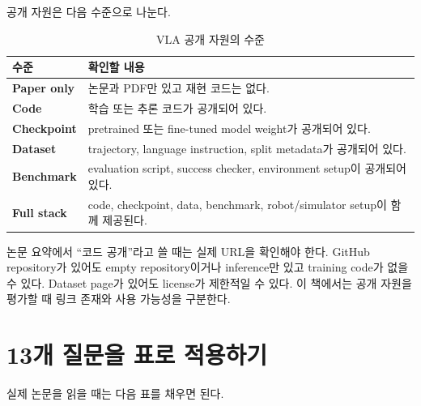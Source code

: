 공개 자원은 다음 수준으로 나눈다.

\begin{table}[t]
  \centering
  \caption{VLA 공개 자원의 수준}
  \label{tab:resource_levels}
  \begin{tabularx}{\textwidth}{>{\bfseries}p{28mm}X}
    \toprule
    수준 & 확인할 내용 \\
    \midrule
    Paper only & 논문과 PDF만 있고 재현 코드는 없다. \\
    Code & 학습 또는 추론 코드가 공개되어 있다. \\
    Checkpoint & pretrained 또는 fine-tuned model weight가 공개되어 있다. \\
    Dataset & trajectory, language instruction, split metadata가 공개되어 있다. \\
    Benchmark & evaluation script, success checker, environment setup이 공개되어 있다. \\
    Full stack & code, checkpoint, data, benchmark, robot/simulator setup이 함께 제공된다. \\
    \bottomrule
  \end{tabularx}
\end{table}

논문 요약에서 ``코드 공개''라고 쓸 때는 실제 URL을 확인해야 한다. GitHub repository가 있어도 empty repository이거나 inference만 있고 training code가 없을 수 있다. Dataset page가 있어도 license가 제한적일 수 있다. 이 책에서는 공개 자원을 평가할 때 링크 존재와 사용 가능성을 구분한다.

\section{13개 질문을 표로 적용하기}

실제 논문을 읽을 때는 다음 표를 채우면 된다.


